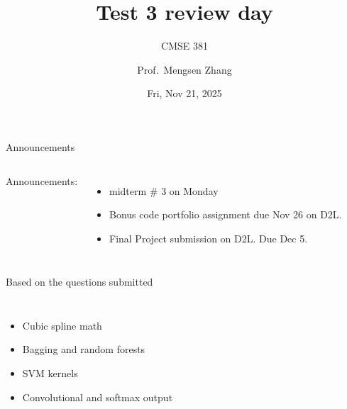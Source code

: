 \documentclass[aspectratio=169,usenames,dvipsnames]{beamer}
\begin{document}
\title[Review day]{Test 3 review day}
\subtitle{CMSE 381}
\date{Fri, Nov 21, 2025}



\author[Dr.~Zhang]{Prof.~Mengsen Zhang}

\begin{frame}
 \titlepage


\end{frame}
\begin{frame}[c]{Announcements}

\begin{columns}

\centering

	Announcements: 
	\begin{itemize}
		\item midterm \# 3 on Monday
		\item Bonus code portfolio assignment due Nov 26 on D2L.
		\item Final Project submission on D2L. Due Dec 5. 
	\end{itemize}
\end{columns}

\end{frame}
\begin{frame}[c]{Based on the questions submitted}

\begin{columns}
\centering
\begin{itemize}
	\item Cubic spline math
	\item Bagging and random forests
	\item SVM kernels
	\item Convolutional and softmax output
\end{itemize}
\centering

\end{columns}

\end{frame}
\end{document}
